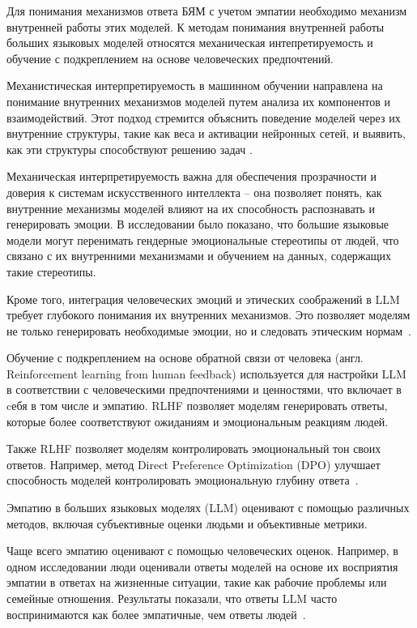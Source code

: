 Для понимания механизмов ответа БЯМ с учетом эмпатии необходимо механизм внутренней работы этих моделей.  К методам понимания внутренней работы больших языковых моделей относятся механическая интепретируемость и обучение с подкреплением на основе человеческих предпочтений.

Механистическая интерпретируемость в машинном обучении направлена на понимание внутренних механизмов моделей путем анализа их компонентов и взаимодействий. Этот подход стремится объяснить поведение моделей через их внутренние структуры, такие как веса и активации нейронных сетей, и выявить, как эти структуры способствуют решению задач \cite{https://doi.org/10.48550/arxiv.2309.16042}.


Механическая интерпретируемость важна для обеспечения прозрачности и доверия к системам искусственного интеллекта -- она позволяет понять, как внутренние механизмы моделей влияют на их способность распознавать и генерировать эмоции. В исследовании \cite{
https://doi.org/10.48550/arxiv.2403.03121} было показано, что большие языковые модели могут перенимать гендерные эмоциональные стереотипы от людей, что связано с их внутренними механизмами и обучением на данных, содержащих такие стереотипы.

Кроме того, интеграция человеческих эмоций и этических соображений в LLM требует глубокого понимания их внутренних механизмов. Это позволяет моделям не только генерировать необходимые эмоции, но и следовать этическим нормам~\cite{https://doi.org/10.48550/arxiv.2404.13071}.

Обучение с подкреплением на основе обратной связи от человека (англ. Reinforcement learning from human feedback) используется для настройки LLM в соответствии с человеческими предпочтениями и ценностями, что включает в cебя в том числе и эмпатию. RLHF позволяет моделям генерировать ответы, которые более соответствуют ожиданиям и эмоциональным реакциям людей.

Также RLHF позволяет моделям контролировать эмоциональный тон своих ответов. Например, метод Direct Preference Optimization (DPO) улучшает способность моделей контролировать эмоциональную глубину ответа~\cite{https://doi.org/10.48550/arxiv.2305.18290}.

Эмпатию в больших языковых моделях (LLM) оценивают с помощью различных методов, включая субъективные оценки людьми и объективные метрики.

Чаще всего эмпатию оценивают с помощью человеческих оценок. Например, в одном исследовании люди оценивали ответы моделей на основе их восприятия эмпатии в ответах на жизненные ситуации, такие как рабочие проблемы или семейные отношения. Результаты показали, что ответы LLM часто воспринимаются как более эмпатичные, чем ответы людей~\cite{lee2024large}.

